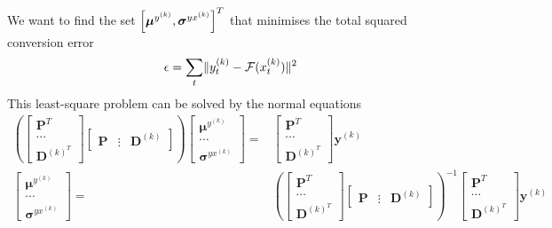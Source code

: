 We want to find the set $\left[\boldsymbol{\mu}^{y^{(k)}}, \boldsymbol{\sigma}^{yx^{(k)}}\right]^T$ that minimises the total squared conversion error
\begin{equation}
	\label{eq:conversion_error}
	\epsilon = \sum_{t} \lVert y_t^{(k)} - \mathcal F(x_t^{(k)})\rVert^2
\end{equation}
This least-square problem can be solved by the normal equations \cite{strang06}
\begin{equation}
	\label{eq:param_computed}
	\begin{split}
		\left( 
		\begin{bmatrix}
			\mathbf{P}^T \\
			\dotsi \\
			\mathbf{D}^{(k)^T}
		\end{bmatrix}
		\begin{bmatrix}
			\mathbf{P} & \vdots & \mathbf{D}^{(k)}
		\end{bmatrix}
		 \right)
		\begin{bmatrix}
			\boldsymbol{\mu}^{y^{(k)}} \\
			\dotsi \\
			\boldsymbol{\sigma}^{yx^{(k)}}
		\end{bmatrix}
		= &
		\begin{bmatrix}
			\mathbf{P}^T \\
			\dotsi \\
			\mathbf{D}^{(k)^T}
		\end{bmatrix}
		\mathbf{y}^{(k)} \\ %
		\begin{bmatrix}
			\boldsymbol{\mu}^{y^{(k)}} \\
			\dotsi \\
			\boldsymbol{\sigma}^{yx^{(k)}}
		\end{bmatrix}
		= &
		\left( 
		\begin{bmatrix}
			\mathbf{P}^T \\
			\dotsi \\
			\mathbf{D}^{(k)^T}
		\end{bmatrix}
		\begin{bmatrix}
			\mathbf{P} & \vdots & \mathbf{D}^{(k)}
		\end{bmatrix}
		 \right)^{-1}
		\begin{bmatrix}
			\mathbf{P}^T \\
			\dotsi \\
			\mathbf{D}^{(k)^T}
		\end{bmatrix}
		\mathbf{y}^{(k)} \\ %
	\end{split}
\end{equation}

